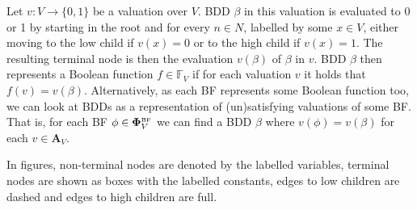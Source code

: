 \documentclass[
  digital, %
  color,
  twoside, %
  table,   %
  nolof,     %
  nolot,     %
]{fithesis3}
\theoremstyle{definition}
\theoremstyle{remark}
\newcommand{\BF}[1]{\mathbf{\Phi}_{#1}^{\normalfont{\text{\tiny BF}}}}
\newcommand{\valtns}[1]{\mathbf{A}_{#1}}
\newcommand{\BFuncs}[1]{\mathbb{F}_{#1}}
\begin{document}
Let $v\colon V \to \{0,1\}$ be a valuation over $V$. BDD $\beta$ in this valuation is evaluated to 0 or 1 by starting in the root and for every $n \in N$, labelled by some $x \in V$, either moving to the low child if $v(x) = 0$ or to the high child if $v(x) = 1$. The resulting terminal node is then the evaluation $v(\beta)$ of $\beta$ in $v$. BDD $\beta$ then represents a Boolean function $f \in \BFuncs{V}$ if for each valuation $v$ it holds that $f(v) = v(\beta)$. Alternatively, as each BF represents some Boolean function too, we can look at BDDs as a representation of (un)satisfying valuations of some BF. That is, for each BF $\phi \in \BF{V}$ we can find a BDD $\beta$ where $v(\phi) = v(\beta)$ for each $v \in \valtns{V}$. %

In figures, non-terminal nodes are denoted by the labelled variables, terminal nodes are shown as boxes with the labelled constants, edges to low children are dashed and edges to high children are full.
\end{document}
